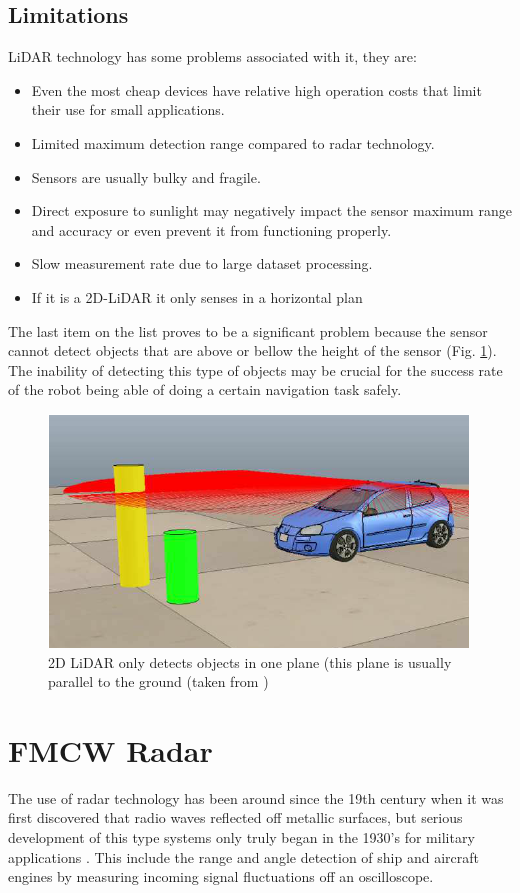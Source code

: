 \subsection{Limitations}
\ac{LiDAR} technology has some problems associated with it, they are:
\begin{itemize}
\item{Even the most cheap devices have relative high operation costs that limit their use for small applications.}  
\item{Limited maximum detection range compared to radar technology.}  
\item{Sensors are usually bulky and fragile.}  
\item{Direct exposure to sunlight may negatively impact the sensor maximum range and accuracy or even prevent it from functioning properly.} 
\item{Slow measurement rate due to large dataset processing.} 
\item {If it is a 2D-\ac{LiDAR} it only senses in a horizontal plan}
\end{itemize}
The last item on the list proves to be a significant problem because the sensor cannot detect objects that are above or bellow the height of the sensor (Fig. \ref{fig:2dlidar}). The inability of detecting this type of objects may be crucial for the success rate of the robot being able of doing a certain navigation task safely.
\begin{figure}[ht]
    \centering
    \includegraphics[scale=0.7]{imgs/chapter2/lidar2d.png}
    \caption[2D \ac{LiDAR} only detecting objects in one plane ]{2D \ac{LiDAR} only detects objects in one plane (this plane is usually parallel to the ground (taken from \cite{yalcin2013approaches})}
    \label{fig:2dlidar}
\end{figure}


\section{FMCW Radar}
The use of \ac{radar} technology has been around since the 19th century when it was first discovered that radio waves reflected off metallic surfaces, but serious development of this type systems only truly began in the 1930's for military applications \cite{radarhistory}. This include the range and angle detection of ship and aircraft engines by measuring incoming signal fluctuations off an oscilloscope. 

